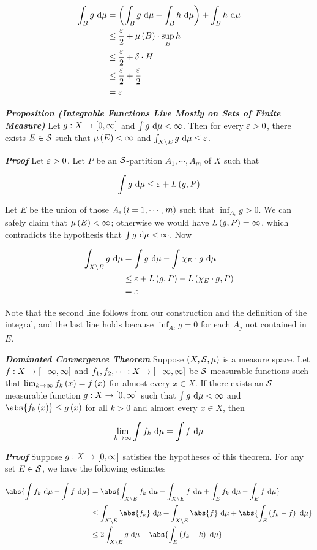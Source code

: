 \documentclass[
]{article}
\begin{document}
\[\ba
\int_Bg\dm & = \pr{\int_B g\dm -\int_Bh\dm}+\int_Bh\dm\\
& \le \frac{\ve}2+\lm{B}\cdot\sup_B h\\
& \le \frac{\ve}2+\delta\cdot H \\
& \le \frac{\ve}2+\frac{\ve}2\\
& = \ve
\ea\]

\emph{\textbf{Proposition (Integrable Functions Live Mostly on Sets of
Finite Measure)}} Let \(g:X\to \br{0,\infty}\) and \(\int g\dm<\infty\).
Then for every \(\ve>0\), there exists \(E\in \S\) such that
\(\lm{E}<\infty\) and \(\int_{X\c E}g\dm\le \ve\).

\emph{\textbf{Proof}} Let \(\ve>0\). Let \(P\) be an \(\S\)-partition
\(A_1,\cdots ,A_m\) of \(X\) such that

\[\int g\dm \le\ve +L\pr{g,P}\]

Let \(E\) be the union of those \(A_i\pr{i = 1,\cdots,m}\) such that
\(\inf_{A_i}g>0\). We can safely claim that \(\lm{E}<\infty\); otherwise
we would have \(L\pr{g,P} = \infty\), which contradicts the hypothesis
that \(\int g\dm<\infty\). Now

\[\ba
\int_{X\c E}g\dm & = \int g\dm -\int\chi_{E}\cdot g\dm\\
& \le \ve+L\pr{g,P}-L\pr{\chi_{E}\cdot g,P} \\
& = \ve
\ea\]

Note that the second line follows from our construction and the
definition of the integral, and the last line holds because
\(\inf_{A_j}g = 0\) for each \(A_j\) not contained in \(E\).

\emph{\textbf{Dominated Convergence Theorem}} Suppose \(\pr{X,\S,\mu}\)
is a measure space. Let \(f:X\to \br{-\infty,\infty}\) and
\(f_1,f_2,\cdots:X\to \br{-\infty,\infty}\) be \(\S\)-measurable
functions such that \(\lim_{k\to\infty}f_k\pr{x} = f\pr{x}\) for almost
every \(x\in X\). If there exists an \(\S\)-measurable function
\(g:X\to\br{0,\infty}\) such that \(\int g\dm<\infty\) and
\(\abs{f_k\pr{x}}\le g\pr{x}\) for all \(k>0\) and almost every
\(x\in X\), then

\[\lim_{k\to\infty} \int f_k\dm = \int f\dm\]

\emph{\textbf{Proof}} Suppose \(g:X\to\br{0,\infty}\) satisfies the
hypotheses of this theorem. For any set \(E\in\S\), we have the
following estimates

\[\ba
\abs{\int f_k\dm-\int f\dm} & = \abs{\int_{X\c E}f_k\dm-\int_{X\c E}f\dm+\int_Ef_k\dm-\int_Ef\dm}\\
& \le \int_{X\c E}\abs{f_k}\dm +\int_{X\c E}\abs{f}\dm+\abs{\int_E\pr{f_k-f}\dm}\\
& \le 2\int_{X\c E}g\dm+\abs{\int_E\pr{f_k-k}\dm}
\ea\]
\end{document}
